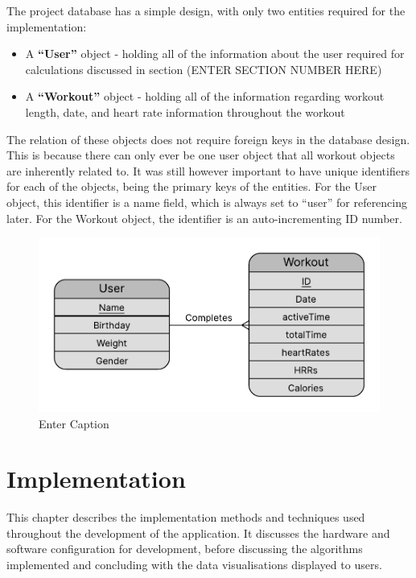 \documentclass{l4proj}
\begin{document}
The project database has a simple design, with only two entities required for the implementation:

\begin{itemize}
    \item A \textbf{“User”} object - holding all of the information about the user required for calculations discussed in section (ENTER SECTION NUMBER HERE)
    \item A \textbf{“Workout”} object - holding all of the information regarding workout length, date, and heart rate information throughout the workout
\end{itemize}

The relation of these objects does not require foreign keys in the database design. This is because there can only ever be one user object that all workout objects are inherently related to. It was still however important to have unique identifiers for each of the objects, being the primary keys of the entities. For the User object, this identifier is a name field, which is always set to “user” for referencing later. For the Workout object, the identifier is an auto-incrementing ID number.

\begin{figure}[h]
    \centering
    \includegraphics[width=0.75\linewidth]{dissertation//dissImages/ERDiagram.pdf}
    \caption{Enter Caption}
    \label{fig:enter-label}
\end{figure}

\chapter{Implementation}

This chapter describes the implementation methods and techniques used throughout the development of the application. It discusses the hardware and software configuration for development, before discussing the algorithms implemented and concluding with the data visualisations displayed to users.
\end{document}

